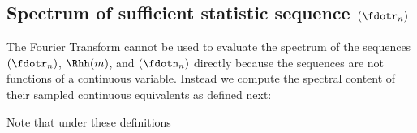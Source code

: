 \subsection{Spectrum of sufficient statistic sequence $(\fdotr_n)$}
The Fourier Transform cannot be used to evaluate the spectrum of the 
sequences $(\fdotr_n)$, $\Rhh(m)$, and $(\fdotn_n)$ directly
because the sequences are not functions of a continuous variable.
Instead we compute the spectral content of their sampled 
continuous equivalents as defined next:

Note that under these definitions




